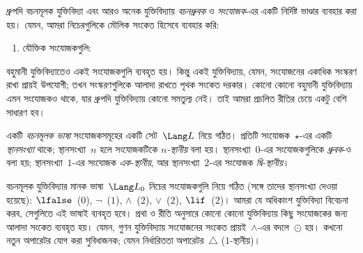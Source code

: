 \documentclass[../../../include/open-logic-section]{subfiles}
\begin{document}


ধ্রুপদি বচনমূলক যুক্তিবিদ্যা এবং আরও অনেক যুক্তিবিদ্যায়
\emph{বচনধ্রুবক} ও \emph{সংযোজক}-এর একটি নির্দিষ্ট ভাণ্ডার ব্যবহার করা
হয়। যেমন, আমরা নিচেরগুলিকে মৌলিক সংকেত হিসেবে ব্যবহার করি:
\begin{enumerate}
\item যৌক্তিক সংযোজকগুলি:
  \startycommalist
\end{enumerate}

বহুমানী যুক্তিবিদ্যাতেও একই সংযোজকগুলি ব্যবহৃত হয়। কিন্তু একই
যুক্তিবিদ্যায়, যেমন, সংযোজনের একাধিক সংস্করণ রাখা প্রায়ই উপযোগী; তখন
সংস্করণগুলিকে আলাদা রাখতে পৃথক সংকেত দরকার। কোনো কোনো বহুমানী
যুক্তিবিদ্যায় এমন সংযোজকও থাকে, যার ধ্রুপদি যুক্তিবিদ্যায় কোনো সমতুল্য
নেই। তাই আমরা প্রচলিত রীতির চেয়ে একটু বেশি সাধারণ হব।

\begin{defn}
  একটি \emph{বচনমূলক ভাষা} সংযোজকসমূহের একটি সেট~$\Lang L$ নিয়ে গঠিত।
  প্রতিটি সংযোজক~$\star$-এর একটি \emph{স্থানসংখ্যা} থাকে; স্থানসংখ্যা~$n$
  হলে সংযোজকটিকে \emph{$n$-স্থানীয়} বলা হয়। স্থানসংখ্যা~$0$-এর
  সংযোজকগুলিকে \emph{ধ্রুবক}-ও বলা হয়; স্থানসংখ্যা~$1$-এর সংযোজক
  \emph{এক-স্থানীয়}, আর স্থানসংখ্যা~$2$-এর সংযোজক \emph{দ্বি-স্থানীয়}।
\end{defn}

\begin{ex}
  বচনমূলক যুক্তিবিদ্যার মানক ভাষা~$\Lang L_0$ নিচের সংযোজকগুলি নিয়ে
  গঠিত (সঙ্গে তাদের স্থানসংখ্যা দেওয়া হয়েছে):
  $\lfalse$~($0$),
  $\lnot$~($1$),
  $\land$~($2$),
  $\lor$~($2$),
  $\lif$~($2$)। আমরা যে অধিকাংশ যুক্তিবিদ্যা বিবেচনা করব, সেগুলিতে এই
  ভাষাই ব্যবহৃত হবে। প্রথা ও রীতি অনুসারে কোনো কোনো যুক্তিবিদ্যায় কিছু
  সংযোজকের জন্য আলাদা সংকেত ব্যবহৃত হয়। যেমন, গুণন যুক্তিবিদ্যায়
  সংযোজনের সংকেত প্রায়ই~$\land$-এর বদলে~$\odot$ হয়। কখনো নতুন অপারেটর
  যোগ করা সুবিধাজনক; যেমন নির্ধারিততা অপারেটর~$\triangle$
  ($1$-স্থানীয়)।
\end{ex}
\end{document}
